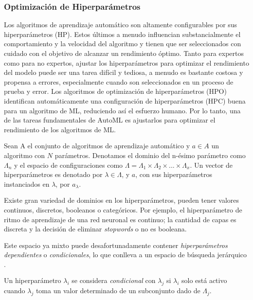 \subsubsection{Optimización de Hiperparámetros}

Los algoritmos de aprendizaje automático son altamente configurables por sus hiperparámetros (HP). Estos últimos a menudo influencian substancialmente el comportamiento y la velocidad del algoritmo y tienen que ser seleccionados con cuidado con el objetivo de alcanzar un rendimiento óptimo. Tanto para expertos como para no expertos, ajustar los hiperparámetros para optimizar el rendimiento del modelo puede ser una tarea difícil y tediosa, a menudo es bastante costosa y propensa a errores, especialmente cuando son seleccionados en un proceso de prueba y error. Los algoritmos de optimización de hiperparámetros (HPO) identifican automáticamente una configuración de hiperparámetros (HPC) buena para un algoritmo de ML, reduciendo así el esfuerzo humano. Por lo tanto, una de las tareas fundamentales de AutoML es ajustarlos para optimizar el rendimiento de los algoritmos de ML.

\begin{definition}
	Sean A el conjunto de algoritmos de aprendizaje automático y $a \in A$ un algoritmo con $N$ parámetros. Denotamos el dominio del n-ésimo parámetro como $\Lambda_n$ y el espacio de configuraciones como $\Lambda = \Lambda_1 \times \Lambda_2 \times ... \times \Lambda_x$. Un vector de hiperparámetros es denotado por $\lambda \in \Lambda$, y $a$, con sus hiperparámetros instanciados en $\lambda$, por $a_\lambda$.
\end{definition}


Existe gran variedad de dominios en los hiperparámetros, pueden tener valores continuos, discretos, booleanos o categóricos. Por ejemplo, el hiperparámetro de ritmo de aprendizaje de una red neuronal es continuo; la cantidad de capas es discreta y la decisión de eliminar \textit{stopwords} o no es booleana. 

Este espacio ya mixto puede desafortunadamente contener \textit{hiperparámetros dependientes} o \textit{condicionales}, lo que conlleva a un espacio de búsqueda jerárquico \cite{bischl2021hyperparameter}.

\begin{definition}
	Un hiperparámetro $\lambda_i$ se considera \textit{condicional} con $\lambda_j$ si $\lambda_i$ solo está activo cuando $\lambda_j$ toma un valor determinado de un subconjunto dado de $\Lambda_j$.
\end{definition} 

